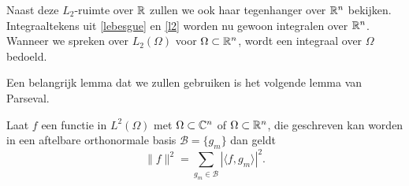 Naast deze $L_2$-ruimte over $\mathbb{R}$ zullen we ook haar tegenhanger over $\mathbb{R}^n$ bekijken. Integraaltekens uit \eqref{lebesgue} en \eqref{l2} worden nu gewoon integralen over $\mathbb{R}^n$. Wanneer we spreken over $L_2(\Omega)$ voor $\Omega \subset \mathbb{R}^n$, wordt een integraal over $\Omega$ bedoeld.

Een belangrijk lemma dat we zullen gebruiken is het volgende lemma van Parseval.
\begin{lemm}
  \label{parseval}
  Laat $f$ een functie in $L^2(\Omega)$ met $\Omega \subset \mathbb{C}^n$ of $\Omega\subset\mathbb{R}^n$, die geschreven kan worden in een aftelbare 
  orthonormale basis $\mathcal{B}=\{g_m\}$ dan geldt
  \[
  \|f\|^2 = \sum_{g_m\in\mathcal{B}} | \langle f, g_m \rangle |^2.
  \]
\end{lemm}


